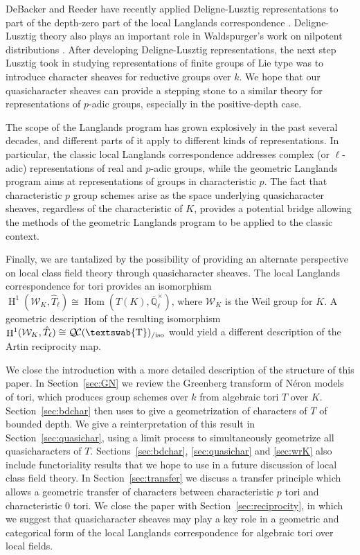 \documentclass{amsart}
\theoremstyle{plain}
\theoremstyle{definition}
\theoremstyle{remark}
\newcommand{\EE}{\mathbb{\bar Q}_\ell}
\newcommand{\Fq}{k}
\newcommand{\EEx}{\EE^\times}
\newcommand{\Weil}[1]{\mathcal{W}_{#1}}
\newcommand{\mathswab}[1]{\operatorname{\textswab{#1}}}
\newcommand{\GN}[1]{\mathswab{#1}}
\DeclareMathOperator{\Hom}{Hom}
\DeclareMathOperator{\Hh}{H}
\newcommand{\QC}{{\mathcal{Q\hskip-0.8pt C}}}
\newcommand{\QCiso}[1]{\QC(#1)_{/\text{iso}}}
\begin{document}
DeBacker and Reeder have recently applied Deligne-Lusztig
representations to part of the depth-zero part of the
local Langlands correspondence \cite{reeder-debacker:09a}.
Deligne-Lusztig theory also plays an important role in
Waldspurger's work on nilpotent distributions \cite{waldspurger:01}.
After developing Deligne-Lusztig representations,
the next step Lusztig took in studying representations
of finite groups of Lie type was to introduce character sheaves for reductive groups over $\Fq$.
We hope that our quasicharacter sheaves
can provide a stepping stone to a similar theory for
representations of $p$-adic groups, especially
in the positive-depth case.

The scope of the Langlands program has grown explosively in the past several decades, and
different parts of it apply to different kinds of representations.  In particular, the classic local Langlands
correspondence addresses complex (or $\ell$-adic) representations of real and $p$-adic groups, while
the geometric Langlands program aims at representations of groups in characteristic $p$.  The fact that
characteristic $p$ group schemes arise as the space underlying quasicharacter sheaves, regardless of
the characteristic of $K$, provides a potential bridge allowing the methods of the geometric Langlands
program to be applied to the classic context.

Finally, we are tantalized by the possibility of providing an alternate perspective on local class field theory
through quasicharacter sheaves.  The local Langlands correspondence for tori provides an isomorphism
$
\Hh^1(\Weil{K}, \hat{T}_\ell) \cong \Hom(T(K), \EEx)
$,
where $\Weil{K}$ is the Weil group for $K$.
A geometric description of the resulting isomorphism $\Hh^1(\Weil{K}, \hat{T}_\ell) \cong \QCiso{\GN{T}}$
would yield a different description of the Artin reciprocity map.

We close the introduction with a more detailed description of the structure of this paper.
In Section~\ref{sec:GN} we review the Greenberg transform of N\'eron models of tori, which produces
group schemes over $\Fq$ from algebraic tori $T$ over $K$.
Section~\ref{sec:bdchar} then uses \cite{cunningham-roe:dictionary} to give a geometrization of characters of $T$
of bounded depth.
We give a reinterpretation of this result in Section~\ref{sec:quasichar}, using a limit process to simultaneously
geometrize all quasicharacters of $T$.  Sections~\ref{sec:bdchar}, \ref{sec:quasichar} and \ref{sec:wrK} also include
functoriality results that we hope to use in a future discussion of
local class field theory.
In Section~\ref{sec:transfer} we discuss a transfer principle which allows
a geometric transfer of characters between characteristic $p$ tori and characteristic $0$ tori.
We close the paper with Section~\ref{sec:reciprocity}, in which we suggest that quasicharacter
sheaves may play a key role in a geometric and categorical form of the local Langlands
correspondence for algebraic tori over local fields.
\end{document}
